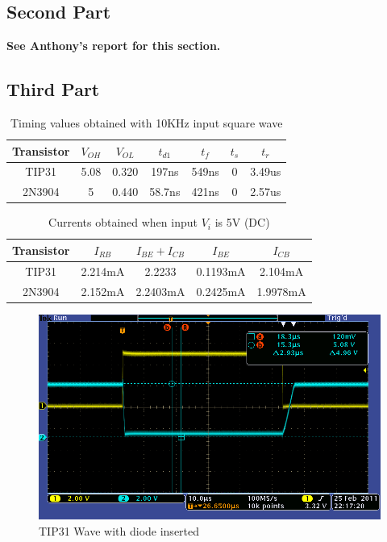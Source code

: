 \documentclass[10pt]{article}
\begin{document}
	\subsection{Second Part}
	\textbf{See Anthony's report for this section.}

	\subsection{Third Part}
		\begin{table}[H]
			\centering
			\begin{tabular}{*{6}{c|}c}
			Transistor & $V_{OH}$ & $V_{OL}$ & $t_{d1}$ & $t_f$ & $t_s$ & $t_r$
			\\ \hline

			TIP31 & 5.08 & 0.320 & 197ns & 549ns & 0 & 3.49us \\

			2N3904 & 5 & 0.440 & 58.7ns & 421ns & 0 & 2.57us \\

			\end{tabular}
			\caption{Timing values obtained with 10KHz input square wave}
		\end{table}

		\begin{table}[H]
			\centering
			\begin{tabular}{*{4}{c|}c}
				Transistor & $I_{RB}$ & $I_{BE} + I_{CB}$ & $I_{BE}$ & $I_{CB}$ \\ \hline
				TIP31  & 2.214mA & 2.2233 & 0.1193mA & 2.104mA \\
				2N3904 & 2.152mA & 2.2403mA & 0.2425mA & 1.9978mA \\
			\end{tabular}
			\caption{Currents obtained when input $V_i$ is 5V (DC)}
			\label{tbl:3}
		\end{table}

		\begin{figure}[H]
			\centering
			\includegraphics[width=4.5in]{wave_3_tip31.png}
			\caption{TIP31 Wave with diode inserted}
			\label{fig:tip31-3}
		\end{figure}
\end{document}
